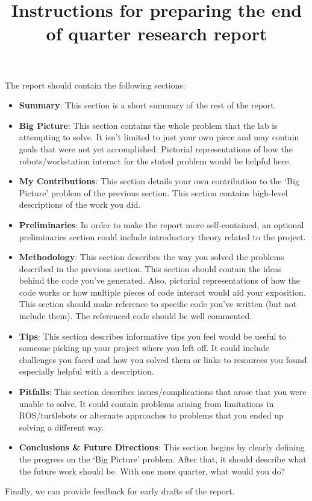 \documentclass{article}
\begin{document}
 
\title{Instructions for preparing the end of quarter research report}
\date{}

\maketitle
\vspace{-5ex}


The report should contain the following sections:
\begin{itemize}
\item {\bf Summary}: This section is a short summary of the rest of the report.
\item {\bf Big Picture}: This section contains the whole problem that the lab is
  attempting to solve. It isn't limited to just your own piece and
  may contain goals that were not yet accomplished.  Pictorial
  representations of how the robots/workstation interact for the
  stated problem would be helpful here.
\item {\bf My Contributions}:  This section details your own
  contribution to the `Big Picture' problem of the previous
  section. This section contains high-level descriptions of the work
  you did.
\item {\bf Preliminaries}: In order to make the report more self-contained, an optional preliminaries section could include introductory theory related to the project.
\item {\bf Methodology}: This section describes the way you solved the
  problems described in the previous section.  This section should
  contain the ideas behind the code you've generated.  Also, pictorial
  representations of how the code works or how multiple pieces of code
  interact would aid your exposition.  This section should make
  reference to specific code you've written (but not include them).
  The referenced code should be well commented.
\item {\bf Tips}: This section describes informative tips you feel
  would be useful to someone picking up your project where you left
  off.  It could include challenges you faced and how you solved
  them or links to resources you found especially helpful with a
  description.
\item {\bf Pitfalls}: This section describes issues/complications that arose that
  you were unable to solve.  It could contain problems arising from
  limitations in ROS/turtlebots or alternate approaches to problems
  that you ended up solving a different way.
\item{\bf Conclusions \& Future Directions}: This section begins by clearly
  defining the progress on the `Big Picture' problem.  After that, it
  should describe what the future work should be.  With one more
  quarter, what would you do?
\end{itemize}

Finally, we can provide feedback for early drafts of the report.
\end{document}

